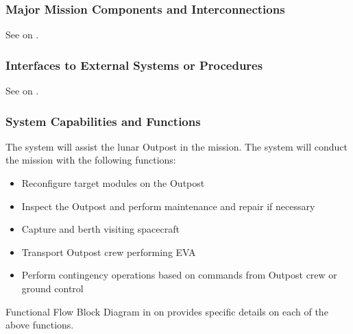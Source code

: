 \documentclass[12pt, letter]{article}
\begin{document}
\subsubsection{Major Mission Components and Interconnections}
See  on .%
\subsubsection{Interfaces to External Systems or Procedures}
See  on .%
\subsubsection{System Capabilities and Functions}
\label{functions}
The system will assist the lunar Outpost in the mission. The system will conduct the mission with the following functions:
\begin{itemize}
\item{Reconfigure target modules on the Outpost}
\item{Inspect the Outpost and perform maintenance and repair if necessary}
\item{Capture and berth visiting spacecraft}
\item{Transport Outpost crew performing EVA}
\item{Perform contingency operations based on commands from Outpost crew or ground control}
\end{itemize}
Functional Flow Block Diagram in  on  provides specific details on each of the above functions.
\newpage
\end{document}
